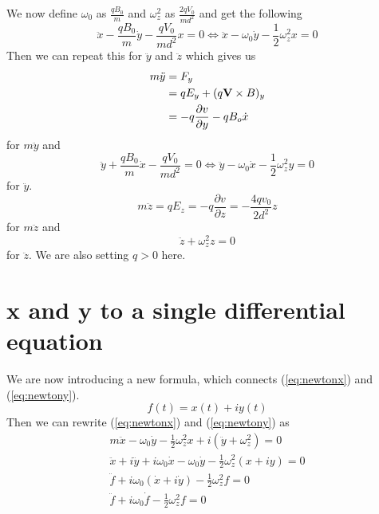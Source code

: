 \documentclass[english,notitlepage,reprint,nofootinbib]{revtex4-1}  %
\begin{document}
	We now define $\omega_0$ as $\frac{q B_0}{m}$ and $\omega_z^2$ as $\frac{2 q V_0}{md^2}$ and get the following
	\begin{equation} \label{eq:newton_x}
		\ddot{x} - \frac{q B_0}{m} \dot{y} - \frac{q V_0}{m d^2} x = 0 \Leftrightarrow \ddot{x} - \omega_0 \dot{y} - \frac{1}{2} \omega^2_z x = 0
	\end{equation}
	Then we can repeat this for $\ddot{y}$ and $\ddot{z}$ which gives us
	\begin{align*}
		m \ddot{y} &= F_y \\
		&= q E_y + (q \vectorbold{V} \times B)_y \\
		&= - q \frac{\partial v}{\partial y} - q B_o \dot{x}
	\end{align*}
	for $m \ddot{y}$ and 
	\begin{equation} 
		\ddot{y} + \frac{q B_0}{m} \dot{x} - \frac{q V_0}{m d^2} = 0 \Leftrightarrow \ddot{y} - \omega_0 \dot{x} - \frac{1}{2} \omega^2_z y = 0
	\end{equation}
	for $\ddot{y}$.
	\begin{equation*}
		m \ddot{z} = q E_z = -q \frac{\partial v}{\partial z} = - \frac{4 q v_0}{2 d^2} z
	\end{equation*}
	for $m \ddot{z}$ and
	\begin{equation} 
		\ddot{z} + \omega^2_z z = 0
	\end{equation}
	for $\ddot{z}$. We are also setting $q > 0$ here.

	\section{x and y to a single differential equation} \label{eq_motion2}
	We are now introducing a new formula, which connects (\ref{eq:newtonx}) and (\ref{eq:newtony}).
	\begin{equation*}
		f(t) = x(t) + iy(t)
	\end{equation*}
	Then we can rewrite (\ref{eq:newtonx}) and (\ref{eq:newtony}) as
	\begin{align*} 
		m \ddot{x} - \omega_0 \dot{y} - \frac{1}{2} \omega_z^2 x + i(\ddot{y} + \omega_z^2) = 0 \\
		\ddot{x} + i \ddot{y} + i \omega_0 \dot{x} - \omega_0 \dot{y} - \frac{1}{2} \omega_z^2 (x + iy) = 0 \\
		\ddot{f} + i \omega_0 (\dot{x} + i \dot{y}) - \frac{1}{2} \omega_z^2 f = 0 \\
		\ddot{f} + i \omega_0 \dot{f} - \frac{1}{2} \omega_z^2 f = 0
	\end{align*}
\end{document}
